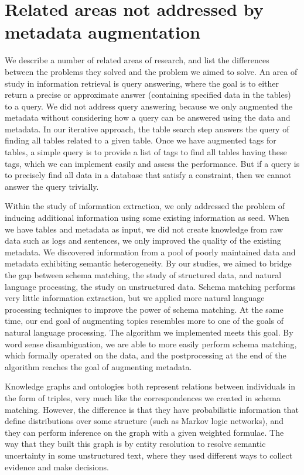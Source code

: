 \section{Related areas not addressed by metadata augmentation}
\label{sec:RelatedAreasNotAddressedByMetadataAugmentation}

We describe a number of related areas of research, and list the differences between the problems they solved and the problem we aimed to solve. An area of study in information retrieval is query answering, where the goal is to either return a precise or approximate answer (containing specified data in the tables) to a query. We did not address query answering because we only augmented the metadata without considering how a query can be answered using the data and metadata. In our iterative approach, the table search step answers the query of finding all tables related to a given table. Once we have augmented tags for tables, a simple query is to provide a list of tags to find all tables having these tags, which we can implement easily and assess the performance. But if a query is to precisely find all data in a database that satisfy a constraint, then we cannot answer the query trivially.

Within the study of information extraction, we only addressed the problem of inducing additional information using some existing information as seed. When we have tables and metadata as input, we did not create knowledge from raw data such as logs and sentences, we only improved the quality of the existing metadata. We discovered information from a pool of poorly maintained data and metadata exhibiting semantic heterogeneity. By our studies, we aimed to bridge the gap between schema matching, the study of structured data, and natural language processing, the study on unstructured data. Schema matching performs very little information extraction, but we applied more natural language processing techniques to improve the power of schema matching. At the same time, our end goal of augmenting topics resembles more to one of the goals of natural language processing. The algorithm we implemented meets this goal. By word sense disambiguation, we are able to more easily perform schema matching, which formally operated on the data, and the postprocessing at the end of the algorithm reaches the goal of augmenting metadata.

Knowledge graphs and ontologies both represent relations between individuals in the form of triples, very much like the correspondences we created in schema matching. However, the difference is that they have probabilistic information that define distributions over some structure (such as Markov logic networks), and they can perform inference on the graph with a given weighted formulae. The way that they built this graph is by entity resolution to resolve semantic uncertainty in some unstructured text, where they used different ways to collect evidence and make decisions.

